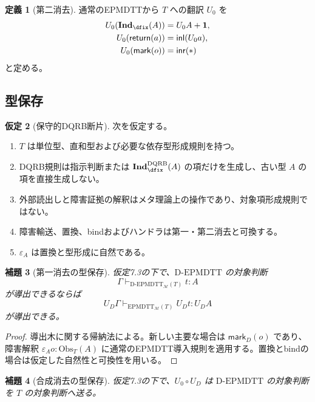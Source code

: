 \documentclass[a4paper,11pt]{ltjsarticle}
\theoremstyle{definition}
\newtheorem{definition}{定義}[section]
\newtheorem{assumption}[definition]{仮定}
\theoremstyle{plain}
\newtheorem{lemma}[definition]{補題}
\newcommand{\DEPMDTT}{\mathrm{D}\text{-}\mathrm{EPMDTT}}
\newcommand{\EPMDTT}{\mathrm{EPMDTT}}
\newcommand{\DQRB}{\mathrm{DQRB}}
\newcommand{\Obs}{\mathrm{Obs}}
\newcommand{\Meta}{\mathcal M}
\newcommand{\Unit}{\mathbf 1}
\newcommand{\Ind}{\mathbf{Ind}_{\dfix}}
\newcommand{\DInd}{\mathbf{Ind}^{\DQRB}_{\dfix}}
\begin{document}
\begin{definition}[第二消去]
通常のEPMDTTから $T$ への翻訳 $U_0$ を
\begin{align}
 U_0(\Ind(A))&=U_0A+\Unit,\\
 U_0(\mathsf{return}(a))&=\mathsf{inl}(U_0a),\\
 U_0(\mathsf{mark}(o))&=\mathsf{inr}(*)
 \label{eq:second-erasure}
\end{align}
と定める。
\end{definition}

\subsection{型保存}

\begin{assumption}[保守的DQRB断片]
次を仮定する。
\begin{enumerate}
 \item $T$ は単位型、直和型および必要な依存型形成規則を持つ。
 \item DQRB規則は指示判断または $\DInd(A)$ の項だけを生成し、古い型 $A$ の項を直接生成しない。
 \item 外部読出しと障害証拠の解釈はメタ理論上の操作であり、対象項形成規則ではない。
 \item 障害輸送、置換、bindおよびハンドラは第一・第二消去と可換する。
 \item $\varepsilon_A$ は置換と型形成に自然である。
\end{enumerate}
\end{assumption}

\begin{lemma}[第一消去の型保存]
仮定7.3の下で、$\DEPMDTT$ の対象判断
\begin{equation}
 \Gamma\vdash_{\DEPMDTT_{\Meta}(T)}t:A
\end{equation}
が導出できるならば
\begin{equation}
 U_D\Gamma\vdash_{\EPMDTT_{\Meta}(T)}U_Dt:U_DA
\end{equation}
が導出できる。
\end{lemma}

\begin{proof}
導出木に関する帰納法による。新しい主要な場合は $\mathsf{mark}_D(o)$ であり、障害解釈 $\varepsilon_Ao:\Obs_T(A)$ に通常のEPMDTT導入規則を適用する。置換とbindの場合は仮定した自然性と可換性を用いる。
\end{proof}

\begin{lemma}[合成消去の型保存]
仮定7.3の下で、$U_0\circ U_D$ は $\DEPMDTT$ の対象判断を $T$ の対象判断へ送る。
\end{lemma}
\end{document}
